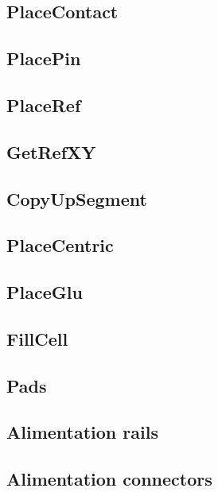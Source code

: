 \documentclass[12pt]{article}
\begin{document}
    \subsection{PlaceContact}
    \label{seccontact}
    
    \subsection{PlacePin}
    \label{secpin}
        
    \subsection{PlaceRef}
    \label{secref}
    
    \subsection{GetRefXY}
    \label{secgetref}
    
    \subsection{CopyUpSegment}
    \label{seccopy}
        
    \subsection{PlaceCentric}
    \label{seccentric}
    
    \subsection{PlaceGlu}
    \label{secglu}
    
    \subsection{FillCell}
    \label{secfillcell}
    
    \subsection{Pads}
    \label{secpads}
    
    \subsection{Alimentation rails}
    \label{secrails}
    
    \subsection{Alimentation connectors}
    \label{secconnectors}
    
\end{document}
